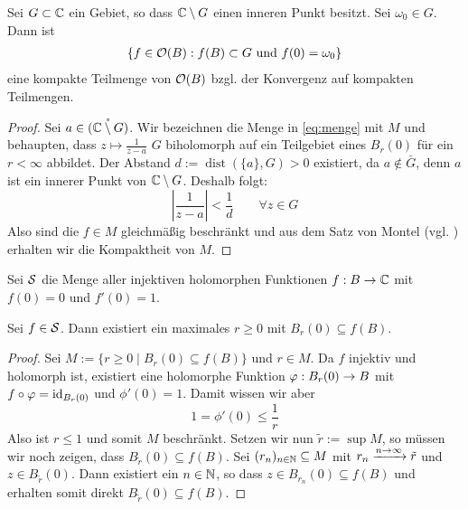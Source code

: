 \begin{lemma}
  \label{lemma:funktion-kompakt}
  Sei $G \subset \C$ ein Gebiet, so dass $\C\setminus G$ einen inneren
  Punkt besitzt. Sei $\omega_0 \in G$. Dann ist
  \begin{align}
  \{f \in \hol(B): f(B) \subset G \text{ und } f(0) = \omega_0
  \} \label{eq:menge} 
  \end{align}
  eine kompakte Teilmenge von $\hol(B)$ bzgl. der Konvergenz auf
  kompakten Teilmengen.
\end{lemma}

\begin{proof}
  Sei $a  \in \mathring{(\C \setminus G)}$. Wir bezeichnen die
  Menge in  \eqref{eq:menge} mit $M$ und behaupten, dass $z \mapsto
  \frac{1}{z-a}$ $G$ biholomorph auf ein Teilgebiet eines
  $B_r(0)$ für ein $r < \infty$ abbildet. 
  Der Abstand $d:= \operatorname{dist}(\{a\},G)> 0$ existiert, da $a \notin \bar
  G$, denn $a$ ist ein innerer Punkt von $\C \setminus G$. Deshalb
  folgt:
  \[
  \left | \frac{1}{z-a} \right |< \frac1d \qquad \forall z \in G
  \]
  Also sind die $f \in M$ gleichmäßig beschränkt und aus dem Satz von
  Montel (vgl. \cite[Satz 4.9]{Frei}) erhalten wir die Kompaktheit von $M$.
\end{proof}

\begin{defin}
  Sei $\S$\index{$\S$} die Menge aller injektiven holomorphen Funktionen $f: B \ra
  \C$ mit $f(0) = 0$ und $f'(0)= 1$.
\end{defin}

\begin{lemma}
  \label{lemma:schlicht-max-rad}
  Sei $f \in \S$. Dann existiert ein maximales $r \geq 0$ mit $B_r(0) \subseteq
  f(B)$.
\end{lemma}

\begin{proof}
  Sei $M:= \{ r\geq 0\mid B_r(0) \subseteq f(B) \}$ und $r \in M$. Da $f$ injektiv und
  holomorph ist, existiert eine holomorphe Funktion $\phi: B_r(0) \ra
  B$ mit $f \circ \phi = \id_{B_r(0)}$ und $\phi'(0) = 1$. Damit wissen
  wir aber
  \[
  1 = \phi'(0) \leq \frac{1}{r}
  \]
  Also ist $r \leq 1$ und somit $M$ beschränkt. Setzen wir nun $\tilde
  r := \sup M$, so müssen wir noch zeigen, dass $B_{\tilde r}(0) \subseteq
  f(B)$.
  Sei $(r_n)_{n \in \N}\subseteq M$ mit $r_n \xrightarrow{n \ra
    \infty} \tilde r$ und $z \in B_{\tilde r}(0)$. Dann existiert ein $n \in \N$,
  so dass $z \in B_{r_n}(0)\subseteq f(B)$ und erhalten somit direkt
  $B_{\tilde r}(0) \subseteq f(B)$.
\end{proof}

